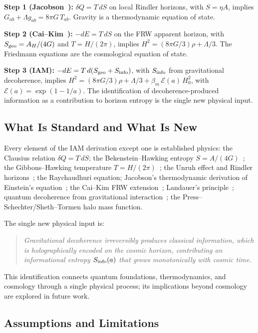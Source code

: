 \documentclass[twocolumn,a4paper,aps,prd,twocolumn,showpacs,notitlepage,superscriptaddress,nofootinbib]{article}
\newcommand{\betam}{\beta_{m}}
\begin{document}
\textbf{Step 1 (Jacobson~\citep{Jacobson1995}):} $\delta Q = T\,dS$ on local
Rindler horizons, with $S = \eta A$, implies
$G_{ab} + \Lambda g_{ab} = 8\pi G\,T_{ab}$.  Gravity is a thermodynamic
equation of state.

\textbf{Step 2 (Cai--Kim~\citep{CaiKim2005}):} $-dE = T\,dS$ on the FRW
apparent horizon, with $S_{\rm geo} = A_H/(4G)$ and $T = H/(2\pi)$, implies
$H^2 = (8\pi G/3)\rho + \Lambda/3$.  The Friedmann equations are the
cosmological equation of state.

\textbf{Step 3 (IAM):} $-dE = T\,d(S_{\rm geo} + S_{\rm info})$, with
$S_{\rm info}$ from gravitational decoherence, implies
$H^2 = (8\pi G/3)\rho + \Lambda/3 + \betam\,\mathcal{E}(a)\,H_0^2$, with
$\mathcal{E}(a) = \exp(1-1/a)$.  The identification of decoherence-produced
information as a contribution to horizon entropy is the single new physical
input.

\subsection{What Is Standard and What Is New}

Every element of the IAM derivation except one is established physics:
the Clausius relation $\delta Q = T\,dS$; the Bekenstein--Hawking entropy
$S = A/(4G)$~\citep{Bekenstein1973}; the Gibbons--Hawking temperature
$T = H/(2\pi)$~\citep{GibbonsHawking1977}; the Unruh effect and Rindler
horizons~\citep{Unruh1976}; the Raychaudhuri equation; Jacobson's
thermodynamic derivation of Einstein's equation~\citep{Jacobson1995}; the
Cai--Kim FRW extension~\citep{CaiKim2005}; Landauer's
principle~\citep{Landauer1961}; quantum decoherence from gravitational
interaction~\citep{Zurek2003}; the Press--Schechter/Sheth--Tormen halo mass
function.

The single new physical input is:

\begin{quote}
  \textit{Gravitational decoherence irreversibly produces classical information,
  which is holographically encoded on the cosmic horizon, contributing an
  informational entropy $S_{\rm info}(a)$ that grows monotonically with cosmic
  time.}
\end{quote}

This identification connects quantum foundations, thermodynamics, and cosmology
through a single physical process; its implications beyond cosmology are
explored in future work.

\subsection{Assumptions and Limitations}
\end{document}
